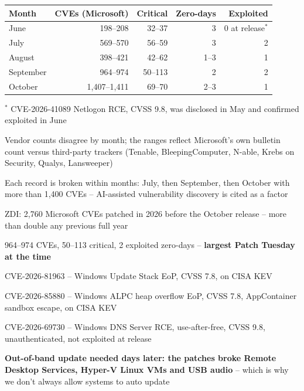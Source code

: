 \documentclass[Screen16to9,17pt]{foils}
\begin{document}

\begin{tabularx}{22cm}{|X|r| r|r|r|}\hline
Month & CVEs (Microsoft) & Critical & Zero-days & Exploited \\\hline
June  & 198--208  & 32--37 & 3 & 0 at release$^{*}$ \\\hline
July  & 569--570  & 56--59 & 3 & 2 \\\hline
August & 398--421 & 42--62 & 1--3 & 1 \\\hline
September & 964--974 & 50--113 & 2 & 2 \\\hline
October & 1{,}407--1{,}411 & 69--70 & 2--3 & 1 \\\hline
\end{tabularx}

{\footnotesize $^{*}$ CVE-2026-41089 Netlogon RCE, CVSS 9.8, was disclosed in May and confirmed exploited in June}

\begin{list2}
\item Vendor counts disagree by month; the ranges reflect Microsoft's own bulletin count versus third-party trackers (Tenable, BleepingComputer, N-able, Krebs on Security, Qualys, Lansweeper)
\item Each record is broken within months: July, then September, then October with more than 1,400 CVEs -- AI-assisted vulnerability discovery is cited as a factor
\item ZDI: 2,760 Microsoft CVEs patched in 2026 before the October release -- more than double any previous full year
\end{list2}


\begin{list2}
\item 964--974 CVEs, 50--113 critical, 2 exploited zero-days -- {\bf largest Patch Tuesday at the time}
\item CVE-2026-81963 -- Windows Update Stack EoP, CVSS 7.8, on CISA KEV
\item CVE-2026-85880 -- Windows ALPC heap overflow EoP, CVSS 7.8, AppContainer sandbox escape, on CISA KEV
\item CVE-2026-69730 -- Windows DNS Server RCE, use-after-free, CVSS 9.8, unauthenticated, not exploited at release\\
\item {\bf Out-of-band update needed days later: the patches broke Remote Desktop Services, Hyper-V Linux VMs and USB audio} -- which is why we don't always allow systems to auto update
\end{list2}
\end{document}
